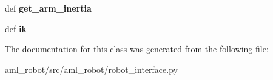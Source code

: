 \begin{DoxyCompactItemize}
\item 
\hypertarget{classaml__robot_1_1robot__interface_1_1_robot_interface_a091a111589b30531072ff604e0f7ad82}{def {\bfseries get\-\_\-arm\-\_\-inertia}}\label{classaml__robot_1_1robot__interface_1_1_robot_interface_a091a111589b30531072ff604e0f7ad82}

\item 
\hypertarget{classaml__robot_1_1robot__interface_1_1_robot_interface_aa98a168bbe6a9b043fbad45c06951f07}{def {\bfseries ik}}\label{classaml__robot_1_1robot__interface_1_1_robot_interface_aa98a168bbe6a9b043fbad45c06951f07}

\end{DoxyCompactItemize}


The documentation for this class was generated from the following file\-:\begin{DoxyCompactItemize}
\item 
aml\-\_\-robot/src/aml\-\_\-robot/robot\-\_\-interface.\-py\end{DoxyCompactItemize}
